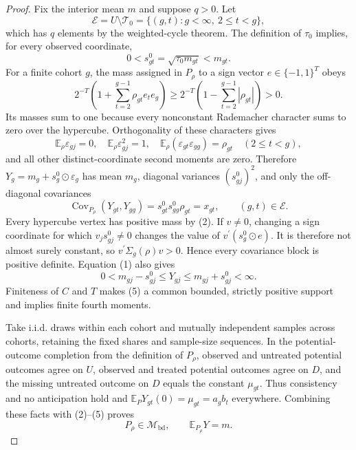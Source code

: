 \documentclass{article}
\begin{document}
\begin{proof}
Fix the interior mean \(m\) and suppose \(q>0\).  Let
\[
\mathcal E=U\setminus\mathcal T_0
=\{(g,t):g<\infty,\ 2\le t<g\},
\]
which has \(q\) elements by the weighted-cycle theorem.  The definition of \(\tau_0\) implies, for every observed coordinate,
\[
0<s^0_{gt}=\sqrt{\tau_0m_{gt}}<m_{gt}.                                  \tag{1}
\]
For a finite cohort \(g\), the mass assigned in \(P_\rho\) to a sign vector \(e\in\{-1,1\}^T\) obeys
\[
2^{-T}\left(1+\sum_{t=2}^{g-1}\rho_{gt}e_te_g\right)
\ge 2^{-T}\left(1-\sum_{t=2}^{g-1}|\rho_{gt}|\right)>0.               \tag{2}
\]
Its masses sum to one because every nonconstant Rademacher character sums to zero over the hypercube.  Orthogonality of these characters gives
\[
\mathbb E_\rho\varepsilon_{gj}=0,
\quad
\mathbb E_\rho\varepsilon_{gj}^2=1,
\quad
\mathbb E_\rho(\varepsilon_{gt}\varepsilon_{gg})=\rho_{gt}
\quad(2\le t<g),                                                        \tag{3}
\]
and all other distinct-coordinate second moments are zero.  Therefore
\(Y_g=m_g+s_g^0\odot\varepsilon_g\) has mean \(m_g\), diagonal variances \((s^0_{gj})^2\), and only the off-diagonal covariances
\[
\operatorname{Cov}_{P_\rho}(Y_{gt},Y_{gg})
=s^0_{gt}s^0_{gg}\rho_{gt}=x_{gt},
\qquad (g,t)\in\mathcal E.                                             \tag{4}
\]
Every hypercube vertex has positive mass by (2).  If \(v\ne0\), changing a sign coordinate for which \(v_js^0_{gj}\ne0\) changes the value of
\(v^{\prime}(s_g^0\odot e)\).  It is therefore not almost surely constant, so
\(v^{\prime}\Sigma_g(\rho)v>0\).  Hence every covariance block is positive definite.  Equation (1) also gives
\[
0<m_{gj}-s^0_{gj}\le Y_{gj}\le m_{gj}+s^0_{gj}<\infty.                 \tag{5}
\]
Finiteness of \(C\) and \(T\) makes (5) a common bounded, strictly positive support and implies finite fourth moments.

Take i.i.d. draws within each cohort and mutually independent samples across cohorts, retaining the fixed shares and sample-size sequences.  In the potential-outcome completion from the definition of \(P_\rho\), observed and untreated potential outcomes agree on \(U\), observed and treated potential outcomes agree on \(D\), and the missing untreated outcome on \(D\) equals the constant \(\mu_{gt}\).  Thus consistency and no anticipation hold and
\(\mathbb E_PY_{gt}(0)=\mu_{gt}=a_gb_t\) everywhere.  Combining these facts with (2)--(5) proves
\[
P_\rho\in\mathcal M_{\mathrm{bd}},
\qquad
\mathbb E_{P_\rho}Y=m.                                                   \tag{6}
\]


\end{proof}
\end{document}
